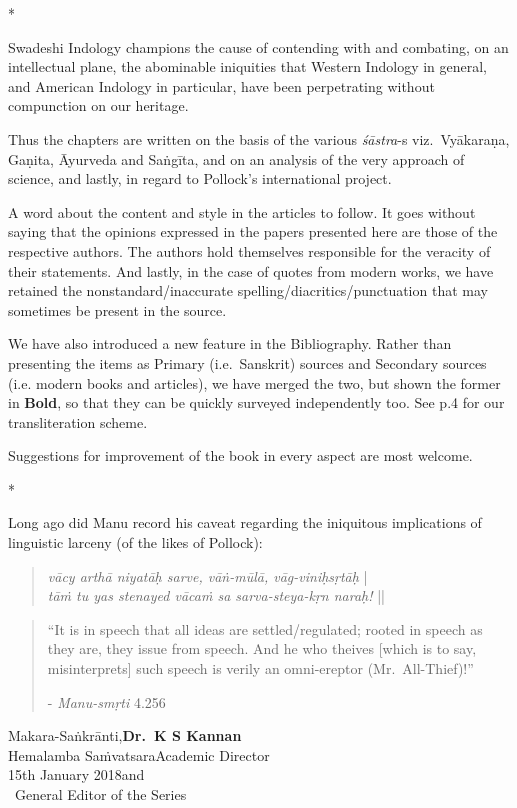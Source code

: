 \centerline{*\quad*\quad*}
\vskip 5pt

Swadeshi Indology champions the cause of contending with and combating, on an intellectual plane, the abominable iniquities that Western Indology in general, and American Indology in particular, have been perpetrating without compunction on our heritage.

Thus the chapters are written on the basis of the various {\sl śāstra}-s viz.\ Vyākaraṇa, Gaṇita, Āyurveda and Saṅgīta, and on an analysis of the very approach of science, and lastly, in regard to Pollock's international project.

A word about the content and style in the articles to follow. It goes without saying that the opinions expressed in the papers presented here are those of the respective authors. The authors hold themselves responsible for the veracity of their statements. And lastly, in the case of quotes from modern works, we have retained the nonstandard/inaccurate spelling/diacritics/punctuation that may sometimes be present in the source.

We have also introduced a new feature in the Bibliography. Rather than presenting the items as Primary (i.e.\ Sanskrit) sources and Secondary sources (i.e. modern books and articles), we have merged the two, but shown the former in {\bf Bold}, so that they can be quickly surveyed independently too. See p.4 for 
our transliteration scheme.

Suggestions for improvement of the book in every aspect are most welcome.
\vskip 10pt

\centerline{*\quad*\quad*}
\vskip 5pt


Long ago did Manu record his caveat regarding the iniquitous implications of linguistic larceny (of the likes of Pollock):

\begin{quote}
{{\sl vācy arthā niyatāḥ sarve, vāṅ-mūlā, vāg-viniḥsṛtāḥ}} |\\
{\sl tāṁ tu yas stenayed vācaṁ sa sarva-steya-kṛn naraḥ!} ||
\end{quote}

\begin{quote}
“It is in speech that all ideas are settled/regulated; rooted in speech as they are, they issue from speech. And he who theives [which is to say, misinterprets] such speech is verily an omni-ereptor (Mr.\ All-Thief)!”

\hfill	- {\sl Manu-smṛti} 4.256
\end{quote}
\bigskip

\noindent
Makara-Saṅkrānti,\hfill	{\bf Dr.~K S Kannan}\\
Hemalamba Saṁvatsara\hfill Academic Director\\
15th January 2018\hfill and\\	
\phantom{.}~\hfill General Editor of the Series
